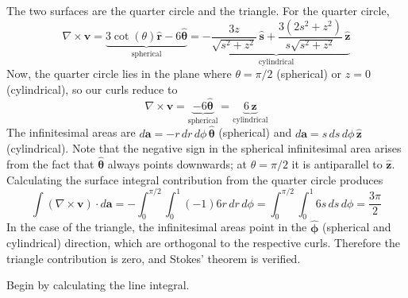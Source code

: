\documentclass[a4paper]{article}
\begin{document}
The two surfaces are the quarter circle and the triangle. For the quarter circle, 
\[
	\nabla \times \pmb{v} = \underbrace{3 \cot\!\left(\theta\right)\pmb{\hat{r}} - 6 \pmb{\hat{\theta}}}_{\text{spherical}} = \underbrace{-\frac{3z}{\sqrt{s^{2} + z^{2}}} \, \pmb{\hat{s}} + \frac{3 \!\left( 2 s^{2} + z^{2} \right)}{s \sqrt{s^{2} + z^{2}}} \, \pmb{\hat{z}}}_{\text{cylindrical}}
\]
Now, the quarter circle lies in the plane where \( \theta = \pi / 2 \) (spherical) or \( z = 0 \) (cylindrical), so our curls reduce to
\[
	\nabla \times \pmb{v} = \underbrace{- 6 \pmb{\hat{\theta}}}_{\text{spherical}} = \underbrace{6 \, \pmb{\hat{z}}}_{\text{cylindrical}}
\]
The infinitesimal areas are \( d \pmb{a} = -r \, dr \, d \phi \, \pmb{\hat{\theta}} \) (spherical) and \( d \pmb{a} = s \, ds \, d \phi \, \pmb{\hat{z}} \) (cylindrical). Note that the negative sign in the spherical infinitesimal area arises from the fact that \( \pmb{\hat{\theta}} \) always points downwards; at \( \theta = \pi / 2 \) it is antiparallel to \( \pmb{\hat{z}} \). Calculating the surface integral contribution from the quarter circle produces
\[
	 \int \!\left( \nabla \times \pmb{v} \right) \cdot d \pmb{a} = -\int^{\pi / 2}_{0} \int^{1}_{0} \!\left( -1 \right)6r \, dr \, d \phi = \int^{\pi / 2}_{0} \int^{1}_{0} 6s \, ds \, d \phi = \frac{3 \pi}{2}
\]
In the case of the triangle, the infinitesimal areas point in the \( \pmb{\hat{\phi}} \) (spherical and cylindrical) direction, which are orthogonal to the respective curls. Therefore the triangle contribution is zero, and Stokes' theorem is verified.

\newpage


Begin by calculating the line integral.
\end{document}
